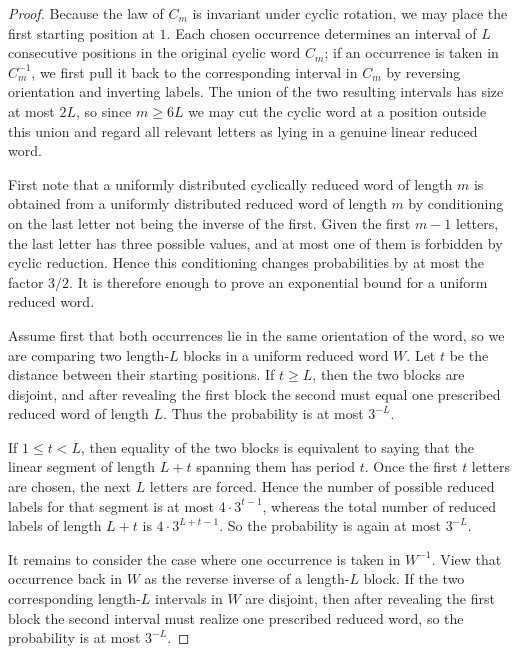 \documentclass{amsproc}
\begin{document}
\begin{proof}
Because the law of $C_m$ is invariant under cyclic rotation, we may place the
first starting position at $1$.  Each chosen occurrence determines an interval
of $L$ consecutive positions in the original cyclic word $C_m$; if an
occurrence is taken in $C_m^{-1}$, we first pull it back to the corresponding
interval in $C_m$ by reversing orientation and inverting labels.  The union of
the two resulting intervals has size at most $2L$, so since $m\geq 6L$ we may
cut the cyclic word at a position outside this union and regard all relevant
letters as lying in a genuine linear reduced word.

First note that a uniformly distributed cyclically reduced word of length $m$ is
obtained from a uniformly distributed reduced word of length $m$ by conditioning
on the last letter not being the inverse of the first.  Given the first $m-1$
letters, the last letter has three possible values, and at most one of them is
forbidden by cyclic reduction.  Hence this conditioning changes probabilities by
at most the factor
$
        3/2.
$
It is therefore enough to prove an exponential bound for a uniform reduced word.

Assume first that both occurrences lie in the same orientation of the word, so
we are comparing two length-$L$ blocks in a uniform reduced word $W$.  Let $t$
be the distance between their starting positions.  If $t\geq L$, then the two
blocks are disjoint, and after revealing the first block the second must equal
one prescribed reduced word of length $L$.  Thus the probability is at most
$3^{-L}$.

If $1\leq t<L$, then equality of the two blocks is equivalent to saying that the
linear segment of length $L+t$ spanning them has period $t$.  Once the first
$t$ letters are chosen, the next $L$ letters are forced.  Hence the number of
possible reduced labels for that segment is at most $4\cdot 3^{t-1}$, whereas
the total number of reduced labels of length $L+t$ is $4\cdot 3^{L+t-1}$.  So
the probability is again at most $3^{-L}$.

It remains to consider the case where one occurrence is taken in $W^{-1}$.  View
that occurrence back in $W$ as the reverse inverse of a length-$L$ block.  If
the two corresponding length-$L$ intervals in $W$ are disjoint, then after
revealing the first block the second interval must realize one prescribed
reduced word, so the probability is at most $3^{-L}$.


\end{proof}
\end{document}
